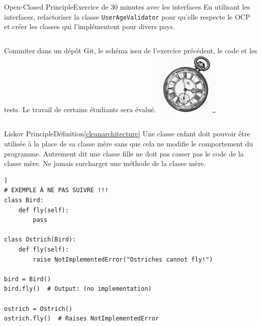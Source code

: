 \documentclass{beamer}
\begin{document}
    \begin{frame}{Open-Closed Principle}{Exercice \execcounterdispinc{} de 30 minutes avec les interfaces}
        En utilisant les interfaces, refactoriser la classe \lstinline{UserAgeValidator} pour qu'elle respecte le OCP et créer les classes qui l'implémentent pour divers pays.
        \bigbreak
        \begin{columns}
            Commiter dans un dépôt Git, le schéma issu de l'exercice précédent, le code et les tests.
            \bigbreak
            Le travail de certains étudiants sera évalué.
            \centering
            \includegraphics[width=3cm]{image/engraving-of-an-old-watch}
        \end{columns}
    \end{frame}

    \begin{frame}[fragile]{Liskov Principle}{Définition\cref{cleanarchitecture}}
        Une classe enfant doit pouvoir être utilisée à la place de sa classe mère sans que cela ne modifie le comportement du programme.
        \bigbreak
        Autrement dit une classe fille ne doit pas casser pas le code de la classe mère.
        Ne jamais surcharger une méthode de la classe mère.
        \begin{lstlisting}[basicstyle=\ttfamily\tiny]]
# EXEMPLE À NE PAS SUIVRE !!!
class Bird:
    def fly(self):
        pass

class Ostrich(Bird):
    def fly(self):
        raise NotImplementedError("Ostriches cannot fly!")

bird = Bird()
bird.fly()  # Output: (no implementation)

ostrich = Ostrich()
ostrich.fly()  # Raises NotImplementedError
        \end{lstlisting}
    \end{frame}
\end{document}
